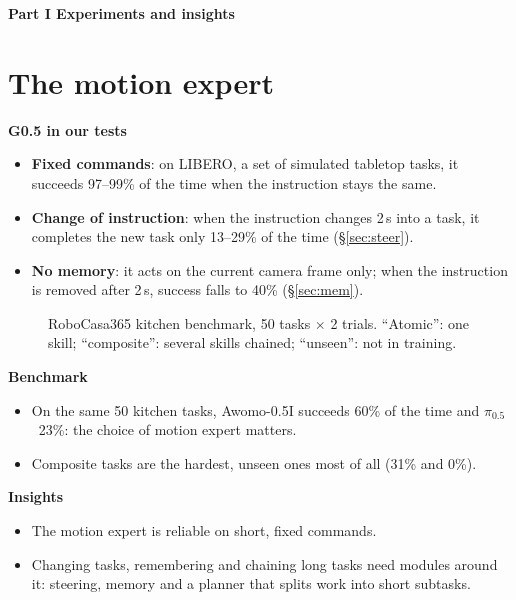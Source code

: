 \documentclass[11pt,a4paper]{article}
\newcommand{\pzf}{$\pi_{0.5}$}
\newcommand{\sub}[1]{\par\needspace{4\baselineskip}\smallskip\noindent\textbf{#1}\par}
\newcommand{\parttitle}[1]{\clearpage\begin{center}{\Large\bfseries #1}\end{center}\vspace{2mm}}
\begin{document}
\parttitle{Part I \quad Experiments and insights}

\section{The motion expert}
\label{sec:vla}
\sub{G0.5 in our tests}
\begin{itemize}
\item \textbf{Fixed commands}: on LIBERO, a set of simulated tabletop tasks, it succeeds 97--99\% of the time when the instruction stays the same.
\item \textbf{Change of instruction}: when the instruction changes 2\,s into a task, it completes the new task only 13--29\% of the time (\S\ref{sec:steer}).
\item \textbf{No memory}: it acts on the current camera frame only; when the instruction is removed after 2\,s, success falls to 40\% (\S\ref{sec:mem}).
\end{itemize}

\begin{figure}[!htbp]\centering
{}
\caption{RoboCasa365 kitchen benchmark, 50 tasks $\times$ 2 trials. ``Atomic'': one skill; ``composite'': several skills chained; ``unseen'': not in training.}
\label{fig:rc365}
\end{figure}

\sub{Benchmark}
\begin{itemize}
\item On the same 50 kitchen tasks, Awomo-0.5I succeeds 60\% of the time and \pzf\ 23\%: the choice of motion expert matters.
\item Composite tasks are the hardest, unseen ones most of all (31\% and 0\%).
\end{itemize}

\sub{Insights}
\begin{itemize}
\item The motion expert is reliable on short, fixed commands.
\item Changing tasks, remembering and chaining long tasks need modules around it: steering, memory and a planner that splits work into short subtasks.
\end{itemize}
\end{document}
